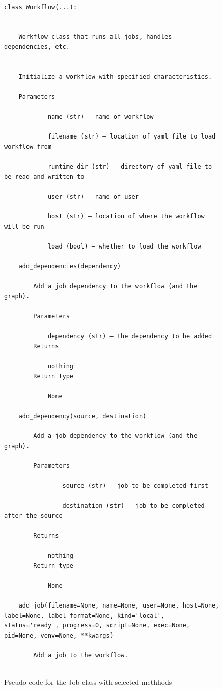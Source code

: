 \begin{figure}[htb]
\caption{Pseudo code for the Job class with selected methhods}
\label{fig:code-workflow}
\begin{verbatim}

class Workflow(...):


    Workflow class that runs all jobs, handles dependencies, etc.


    Initialize a workflow with specified characteristics.

    Parameters

            name (str) – name of workflow

            filename (str) – location of yaml file to load workflow from

            runtime_dir (str) – directory of yaml file to be read and written to

            user (str) – name of user

            host (str) – location of where the workflow will be run

            load (bool) – whether to load the workflow

    add_dependencies(dependency)

        Add a job dependency to the workflow (and the graph).

        Parameters

            dependency (str) – the dependency to be added
        Returns

            nothing
        Return type

            None

    add_dependency(source, destination)

        Add a job dependency to the workflow (and the graph).

        Parameters

                source (str) – job to be completed first

                destination (str) – job to be completed after the source

        Returns

            nothing
        Return type

            None

    add_job(filename=None, name=None, user=None, host=None, label=None, label_format=None, kind='local', status='ready', progress=0, script=None, exec=None, pid=None, venv=None, **kwargs)

        Add a job to the workflow.


\end{verbatim}
\end{figure}
